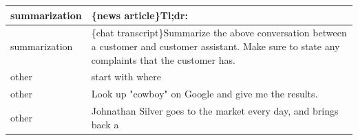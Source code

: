 \documentclass{article}
\begin{document}
\begin{longtable}{p{} p{}}
 summarization &                                                                                                                                                                                                                                                                                                                                                                                                     \{news article\}{\newline}{\newline}Tl;dr: \\ \midrule
 summarization &                                                                                                                                                                                                                                                                    \{chat transcript\}{\newline}{\newline}Summarize the above conversation between a customer and customer assistant. Make sure to state any complaints that the customer has. \\ \midrule
         other &                                                                                                                                                                                                                                                                                                                                                                                                             start with where \\ \midrule
         other &                                                                                                                                                                                                                                                                                                                                                                          Look up "cowboy" on Google and give me the results. \\ \midrule
         other &                                                                                                                                                                                                                                                                                                                                                             Johnathan Silver goes to the market every day, and brings back a \\ \midrule
\end{longtable}
\end{document}
